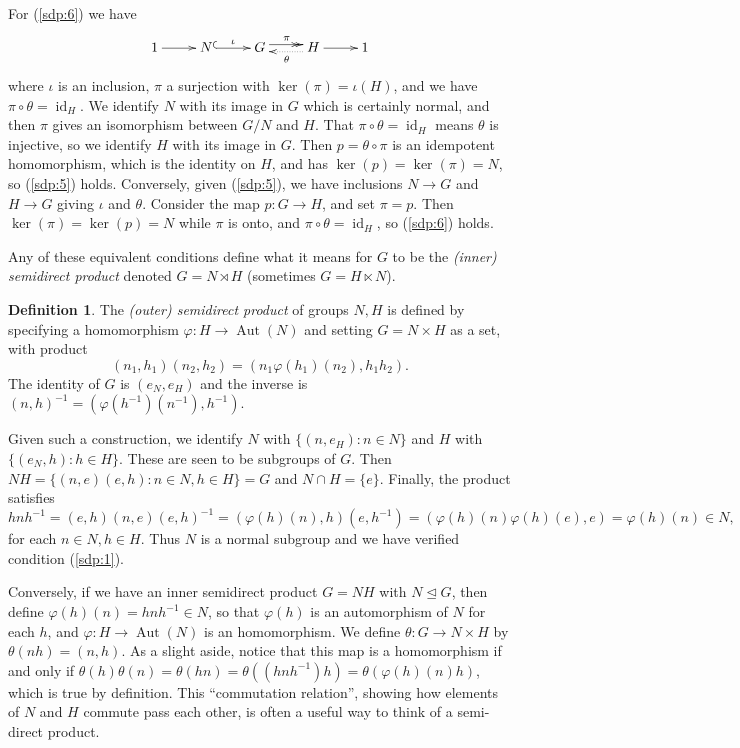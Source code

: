 \documentclass[twoside,a4paper,12pt]{article}
\theoremstyle{plain}
\theoremstyle{definition}
\newtheorem{definition}[proposition]{Definition}
\newcommand{\id}{\operatorname{id}}
\newcommand{\aut}{\operatorname{Aut}}
\begin{document}
For (\ref{sdp:6}) we have
\begin{equation}
\xymatrix{ 1 \ar[r] & N \ar@{^{(}->}[r]^{\iota} & G
\ar@{->>}@<0.6ex>[r]^{\pi} & H \ar[r] \ar@{..>}@<0.6ex>[l]^{\theta} & 1 }
\label{eq:sdp:1}
\end{equation}
where $\iota$ is an inclusion, $\pi$ a surjection with $\ker(\pi) = \iota(H)$, and we have
$\pi\circ\theta = \id_H$.  We identify $N$ with its image in $G$ which is certainly normal, and then
$\pi$ gives an isomorphism between $G/N$ and $H$.  That $\pi\circ\theta=\id_H$ means $\theta$ is injective,
so we identify $H$ with its image in $G$.  Then $p = \theta\circ\pi$ is an idempotent homomorphism,
which is the identity on $H$, and has $\ker(p) = \ker(\pi) = N$, so (\ref{sdp:5}) holds.
Conversely, given (\ref{sdp:5}), we have inclusions $N\rightarrow G$ and $H\rightarrow G$ giving
$\iota$ and $\theta$.  Consider the map $p:G\rightarrow H$, and set $\pi=p$.  Then $\ker(\pi) = \ker(p)
= N$ while $\pi$ is onto, and $\pi\circ\theta = \id_H$, so (\ref{sdp:6}) holds.

Any of these equivalent conditions define what it means for $G$ to be the \emph{(inner) semidirect
product} denoted $G = N \rtimes H$ (sometimes $G = H \ltimes N$).

\begin{definition}
The \emph{(outer) semidirect product} of groups $N,H$ is defined by specifying a homomorphism
$\varphi:H\rightarrow \aut(N)$ and setting $G = N\times H$ as a set, with product
\[ (n_1,h_1)(n_2,h_2) = (n_1 \varphi(h_1)(n_2), h_1h_2). \]
The identity of $G$ is $(e_N, e_H)$ and the inverse is $(n,h)^{-1} = (\varphi(h^{-1})(n^{-1}), h^{-1})$.
\end{definition}

Given such a construction, we identify $N$ with $\{ (n,e_H) : n\in N \}$ and $H$ with $\{ (e_N,h):h\in H\}$.
These are seen to be subgroups of $G$.  Then $NH = \{ (n,e)(e,h) : n\in N, h\in H \} = G$ and $N\cap H=\{e\}$.
Finally, the product satisfies
\[ h n h^{-1} = (e,h)(n,e)(e,h)^{-1}
= (\varphi(h)(n), h) (e,h^{-1})
= (\varphi(h)(n) \varphi(h)(e), e) = \varphi(h)(n) \in N, \]
for each $n\in N, h\in H$.  Thus $N$ is a normal subgroup and we have verified condition (\ref{sdp:1}).

Conversely, if we have an inner semidirect product $G=NH$ with $N \unlhd G$, then define $\varphi(h)(n)
= hnh^{-1} \in N$, so that $\varphi(h)$ is an automorphism of $N$ for each $h$, and $\varphi:H\rightarrow
\aut(N)$ is an homomorphism.  We define $\theta: G \rightarrow N \times H$ by $\theta(nh) =
(n,h)$.  As a slight aside, notice that this map is a homomorphism if and only if $\theta(h) \theta(n) =
\theta(hn) = \theta( (hnh^{-1}) h ) = \theta( \varphi(h)(n) h )$, which is true by definition.
This ``commutation relation'', showing how elements of $N$ and $H$ commute pass each other, is often
a useful way to think of a semi-direct product.
\end{document}
